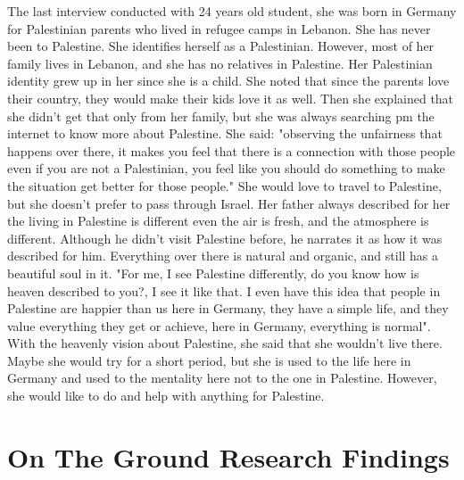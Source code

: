 The last interview conducted with  24 years old student, she was born in Germany for Palestinian parents who lived in refugee camps in Lebanon. She has never been to Palestine. She identifies herself as a Palestinian. However, most of her family lives in Lebanon, and she has no relatives in Palestine. Her Palestinian identity grew up in her since she is a child. She noted that since the parents love their country, they would make their kids love it as well. Then she explained that she didn't get that only from her family, but she was always searching pm the internet to know more about Palestine. She said: "observing the unfairness that happens over there, it makes you feel that there is a connection with those people even if you are not a Palestinian, you feel like you should do something to make the situation get better for those people." She would love to travel to Palestine, but she doesn't prefer to pass through Israel. Her father always described for her the living in Palestine is different even the air is fresh, and the atmosphere is different. Although he didn't visit Palestine before, he narrates it as how it was described for him. Everything over there is natural and organic, and still has a beautiful soul in it. "For me, I see Palestine differently, do you know how is heaven described to you?, I see it like that. I even have this idea that people in Palestine are happier than us here in Germany, they have a simple life, and they value everything they get or achieve, here in Germany, everything is normal". With the heavenly vision about Palestine, she said that she wouldn't live there. Maybe she would try for a short period, but she is used to the life here in Germany and used to the mentality here not to the one in Palestine. However, she would like to do and help with anything for Palestine.

\section{On The Ground Research Findings}

